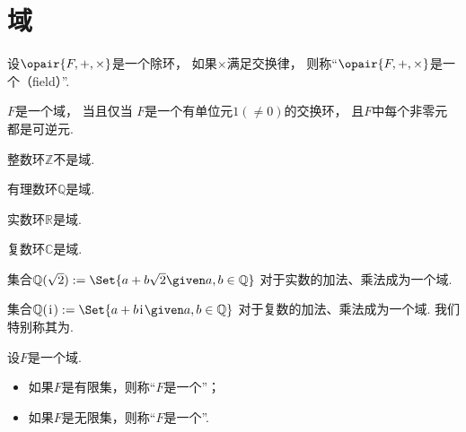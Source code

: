 \section{域}
\begin{definition}
设\(\opair{F,+,\times}\)是一个除环，
如果\(\times\)满足交换律，
则称“\(\opair{F,+,\times}\)是一个（field）”.
\end{definition}

\begin{theorem}
\(F\)是一个域，
当且仅当
\(F\)是一个有单位元\(1(\neq0)\)的交换环，
且\(F\)中每个非零元都是可逆元.
\end{theorem}

\begin{example}
整数环\(\mathbb{Z}\)不是域.
\end{example}

\begin{example}
有理数环\(\mathbb{Q}\)是域.
\end{example}

\begin{example}
实数环\(\mathbb{R}\)是域.
\end{example}

\begin{example}
复数环\(\mathbb{C}\)是域.
\end{example}

\begin{example}
集合\(
	\mathbb{Q}(\sqrt{2})
	\defeq
	\Set{ a + b \sqrt{2} \given a,b \in \mathbb{Q} }
\)
对于实数的加法、乘法成为一个域.
\end{example}

\begin{example}
集合\(
	\mathbb{Q}(\iu)
	\defeq
	\Set{ a + b \iu \given a,b \in \mathbb{Q} }
\)
对于复数的加法、乘法成为一个域.
我们特别称其为.
\end{example}

\begin{definition}
设\(F\)是一个域.
\begin{itemize}
	\item 如果\(F\)是有限集，则称“\(F\)是一个”；
	\item 如果\(F\)是无限集，则称“\(F\)是一个”.
\end{itemize}
\end{definition}

